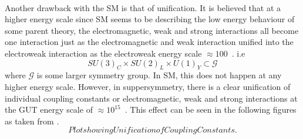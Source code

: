 \paragraph*{}
Another drawback with the SM is that of unification. It is believed that at a higher energy scale since SM seems to be describing the low energy behaviour of some parent theory, the electromagnetic, weak and strong interactions all become one interaction just as the electromagnetic and weak interaction unified into the electroweak interaction as the electroweak energy scale $\approx 100$~\GeV. i.e
\begin{equation}
SU(3)_{C} \times SU(2)_{L} \times U(1)_{Y} \subset \mathcal{G}
\end{equation}
where $\mathcal{G}$ is some larger symmetry group. In SM, this does not happen at any higher energy scale. However, in suppersymmetry, there is a clear unification of individual coupling constants or electromagnetic, weak and strong interactions at the GUT energy scale of $\approx 10^{15}$~\GeV.
This effect can be seen in the following figures as taken from \cite{}.
\begin{equation}
Plot showing Unification of Coupling Constants.
\end{equation}
